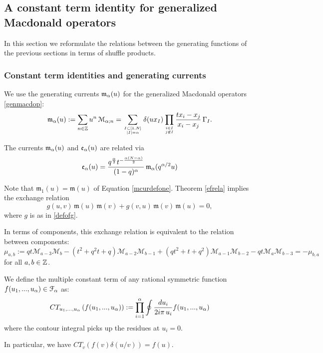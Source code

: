 \subsection{A constant term identity for generalized Macdonald operators}
In this section we reformulate the relations between the
generating functions of the previous sections in terms of shuffle products.

\subsubsection{Constant term identities and generating currents}

We use the generating currents ${\mathfrak m}_{\alpha}(u)$ for the generalized Macdonald operators \eqref{genmacdop}:
\begin{equation}\label{defm}
{\mathfrak m}_{\alpha}(u):=\sum_{n\in {\mathbb Z}} u^n\, {\mathcal M}_{{\alpha};n}
=\sum_{I\subset [1,N]\atop |I|={\alpha}} \delta(u x_I) \prod_{i\in I\atop j\not\in I}
\frac{t x_i-x_j}{x_i - x_j} \, \Gamma_I.
\end{equation}
\begin{remark}
The currents ${\mathfrak m}_{\alpha}(u)$ and ${\mathfrak e}_{\alpha}(u)$ are related via
\begin{equation}\label{emrela}
{\mathfrak e}_{\alpha}(u)=\frac{q^{\frac{{\alpha}}{2}}t^{-\frac{{\alpha}(N-{\alpha})}{2}}}{(1-q)^{\alpha}}\, {\mathfrak m}_{\alpha}(q^{{\alpha}/2}u)
\end{equation}
\end{remark}
Note that ${\mathfrak m}_1(u)={\mathfrak m}(u)$ of Equation \eqref{mcurdefone}. 
Theorem \ref{efrela} implies the exchange relation
\begin{equation}\label{exchange}
g(u,v) \, {\mathfrak m}(u)\, {\mathfrak m}(v)+g(v,u)\, {\mathfrak m}(v)\, {\mathfrak m}(u)=0,
\end{equation}
where $g$ is as in \eqref{defofg}. 

In terms of components, this exchange relation is equivalent to the relation between components:
\begin{equation}\label{cubicM}
\mu_{a,b}:=q t {\mathcal M}_{a-3}{\mathcal M}_{b}-(t^2+q^2 t+q){\mathcal M}_{a-2}{\mathcal M}_{b-1}+(qt^2+t+q^2){\mathcal M}_{a-1}{\mathcal M}_{b-2}-q t{\mathcal M}_{a}{\mathcal M}_{b-3}=-\mu_{b,a}
\end{equation}
for all $a,b\in{\mathbb Z}$.

\begin{defn}
We define the multiple constant term of any rational symmetric function $f(u_1,...,u_{\alpha})\in {\mathcal F}_{\alpha}$ as:
\begin{equation}\label{CTdef}
CT_{u_1,...,u_{\alpha}}\left( f(u_1,...,u_{\alpha})\right):=\prod_{i=1}^{\alpha} \oint \frac{du_i}{2i\pi\, u_i} f(u_1,...,u_{\alpha})
\end{equation}
where the contour integral picks up the residues at $u_i=0$.
\end{defn}
In particular, we have $CT_v( f(v)\delta(u/v))=f(u)$.

